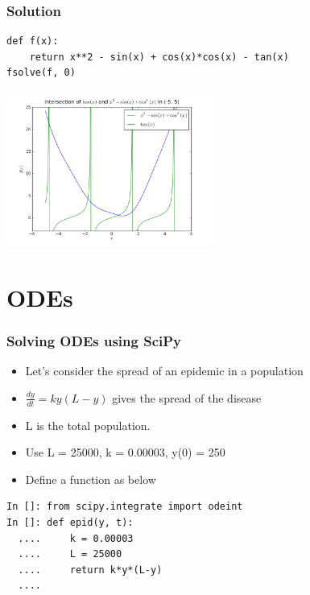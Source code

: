 \documentclass[14pt,compress]{beamer}
\begin{document}
\begin{frame}[fragile]
  \frametitle{Solution}
  \begin{small}
  \begin{lstlisting}
def f(x):
    return x**2 - sin(x) + cos(x)*cos(x) - tan(x)
fsolve(f, 0)
  \end{lstlisting}
  \end{small}
  \begin{center}
\includegraphics[height=2in, interpolate=true]{data/fsolve_tanx}
  \end{center}
\end{frame}




\section{ODEs}

\begin{frame}[fragile]
\frametitle{Solving ODEs using SciPy}
\begin{itemize}
\item Let's consider the spread of an epidemic in a population
\item $\frac{dy}{dt} = ky(L-y)$ gives the spread of the disease
\item L is the total population.
\item Use L = 25000, k = 0.00003, y(0) = 250
\item Define a function as below
\end{itemize}
\begin{lstlisting}
In []: from scipy.integrate import odeint
In []: def epid(y, t):
  ....     k = 0.00003
  ....     L = 25000
  ....     return k*y*(L-y)
  ....
\end{lstlisting}
\end{frame}
\end{document}
